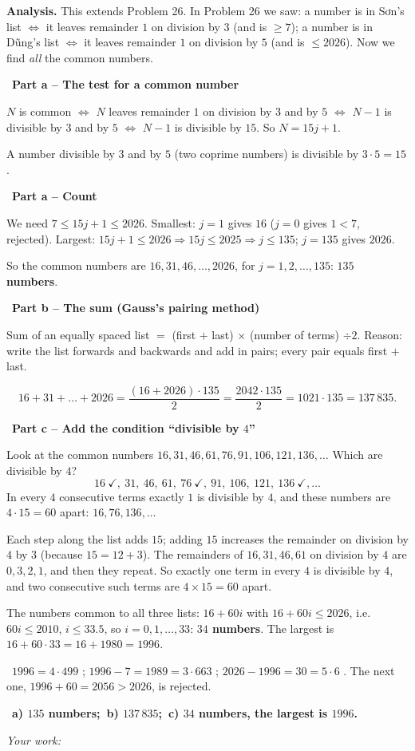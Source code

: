 \documentclass[11pt]{article}
\newif\ifsol \solfalse
\providecommand{\AnsWord}{Đáp số}
\newcommand{\ans}[1]{\par\smallskip{\bfseries\color{tmGreen!88!black}\AnsWord:}\ {\bfseries\color{AnsRed}#1}\par}
\newcommand{\probsol}[1]{%
  \begin{lrbox}{\solmeasure}\begin{minipage}{\dimexpr\linewidth-24pt\relax}#1\end{minipage}\end{lrbox}%
  \ifsol
    \begin{solbox}#1\end{solbox}%
  \else
    \setlength{\solht}{\dimexpr\ht\solmeasure+\dp\solmeasure+0.85cm\relax}%
    \ifdim\solht<1.35cm\setlength{\solht}{1.35cm}\fi
    \ifdim\solht>\StudentMaxWork\setlength{\solht}{\StudentMaxWork}\fi
    \begin{tcolorbox}[colback=white,colframe=Line,boxrule=0.8pt,arc=5pt,
      left=8pt,right=8pt,top=4pt,bottom=4pt,height=\solht]{\footnotesize\color{Slate}\itshape\WorkWord}\end{tcolorbox}%
  \fi}
\newlength{\StudentMaxWork}\setlength{\StudentMaxWork}{7.5cm}
\newcommand{\step}[2]{\par\smallskip\noindent{\bfseries\color{tmBlue!85!black}\StepWord~#1.}\ {\bfseries #2}\par\nopagebreak}
\newcommand{\verify}[1]{\par\smallskip\noindent{\bfseries\color{tmGreen!80!black}\faCheckCircle\ \CheckWord}\ #1\par}
\def\WorkWord{Your work:}
\def\AnsWord{Answer}
\def\StepWord{Step}
\def\CheckWord{Check:}
\begin{document}
\probsol{
\textbf{Analysis.} This extends Problem 26. In Problem 26 we saw: a number is in Sơn's list $\iff$ it leaves remainder $1$ on division by $3$ (and is $\ge 7$); a number is in Dũng's list $\iff$ it leaves remainder $1$ on division by $5$ (and is $\le 2026$). Now we find \emph{all} the common numbers.

\step{1}{Part a -- The test for a common number}
$N$ is common $\iff$ $N$ leaves remainder $1$ on division by $3$ and by $5$ $\iff$ $N-1$ is divisible by $3$ and by $5$ $\iff$ $N-1$ is divisible by $15$. So $N=15j+1$.
\begin{recallbox}A number divisible by $3$ and by $5$ (two coprime numbers) is divisible by $3\cdot 5=15$.\end{recallbox}

\step{2}{Part a -- Count}
We need $7\le 15j+1\le 2026$. Smallest: $j=1$ gives $16$ ($j=0$ gives $1<7$, rejected). Largest: $15j+1\le 2026 \Rightarrow 15j\le 2025 \Rightarrow j\le 135$; $j=135$ gives $2026$.\par
So the common numbers are $16, 31, 46,\dots, 2026$, for $j=1,2,\dots,135$: \textbf{$135$ numbers}.

\step{3}{Part b -- The sum (Gauss's pairing method)}
\begin{recallbox}Sum of an equally spaced list $=$ (first $+$ last) $\times$ (number of terms) $\div 2$. Reason: write the list forwards and backwards and add in pairs; every pair equals first $+$ last.\end{recallbox}
\[ 16+31+\dots+2026=\frac{(16+2026)\cdot 135}{2}=\frac{2042\cdot 135}{2}=1021\cdot 135=137\,835. \]

\step{4}{Part c -- Add the condition ``divisible by $4$''}
Look at the common numbers $16, 31, 46, 61, 76, 91, 106, 121, 136,\dots$ Which are divisible by $4$?
\[ 16\ \checkmark,\ 31,\ 46,\ 61,\ 76\ \checkmark,\ 91,\ 106,\ 121,\ 136\ \checkmark,\dots \]
In every $4$ consecutive terms exactly $1$ is divisible by $4$, and these numbers are $4\cdot 15=60$ apart: $16, 76, 136, \dots$
\begin{proofbox}Each step along the list adds $15$; adding $15$ increases the remainder on division by $4$ by $3$ (because $15=12+3$). The remainders of $16,31,46,61$ on division by $4$ are $0,3,2,1$, and then they repeat. So exactly one term in every $4$ is divisible by $4$, and two consecutive such terms are $4\times15=60$ apart.\end{proofbox}
The numbers common to all three lists: $16+60i$ with $16+60i\le 2026$, i.e.\ $60i\le 2010$, $i\le 33.5$, so $i=0,1,\dots,33$: \textbf{$34$ numbers}. The largest is $16+60\cdot 33=16+1980=1996$.
\verify{$1996=4\cdot 499$ \checkmark; $1996-7=1989=3\cdot 663$ \checkmark; $2026-1996=30=5\cdot 6$ \checkmark. The next one, $1996+60=2056>2026$, is rejected.}
\ans{a) $135$ numbers;\ b) $137\,835$;\ c) $34$ numbers, the largest is $1996$.}
}
\end{document}

